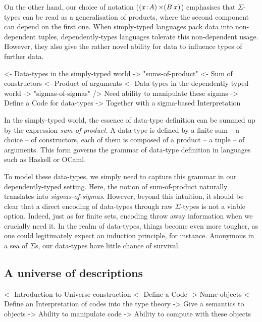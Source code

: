 On the other hand, our choice of notation ($\SIGMA{\V{x}}{A} (B\: x)$)
emphasises that $\Sigma$-types can be read as a generalisation of products,
where the second component can depend on the first one. When simply-typed
languages pack data into non-dependent tuples, dependently-types languages
tolerate this non-dependent usage. However, they also give the rather novel
ability for data to influence types of further data.

\begin{wstructure}
<- Data-types in the simply-typed world
    -> "sums-of-product"
        <- Sum of constructors
        <- Product of arguments
<- Data-types in the dependently-typed world
    -> "sigmas-of-sigmas"
    /> Need ability to manipulate these sigmas
        -> Define a Code for data-types
        -> Together with a sigma-based Interpretation
\end{wstructure}

In the simply-typed world, the essence of data-type definition can be
summed up by the expression \emph{sum-of-product}. A data-type is defined
by a finite sum -- a choice -- of constructors, each of them is
composed of a product -- a tuple -- of arguments. This form governs
the grammar of data-type definition in languages such as Haskell or
OCaml.

To model these data-types, we simply need to capture this grammar in
our dependently-typed setting. Here, the notion of sum-of-product
naturally translates into \emph{sigmas-of-sigmas}. However, beyond
this intuition, it should be clear that a direct encoding of
data-types through raw $\Sigma$-types is not a viable option. Indeed,
just as for finite sets, encoding throw away information when we
crucially need it. In the realm of data-types, things become even more
tougher, as one could legitimately expect an induction principle, for
instance. Anonymous in a sea of $\Sigma$s, our data-types have little
chance of survival. 


\subsection{A universe of descriptions}
\label{sec:desc-universe}

\begin{wstructure}
<- Introduction to Universe construction
    <- Define a Code
        -> Name objects
    <- Define an Interpretation of codes into the type theory
        -> Give a semantics to objects
    -> Ability to manipulate code
    -> Ability to compute with these objects
\end{wstructure}

